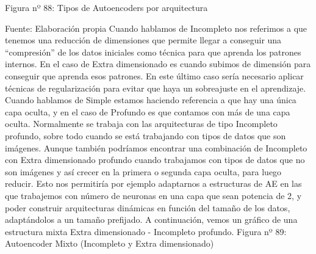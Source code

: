 \documentclass[
  a4paper,
  DIV=11,
  numbers=noendperiod]{scrreprt}
\begin{document}
Figura nº 88: Tipos de Autoencoders por arquitectura

Fuente: Elaboración propia Cuando hablamos de Incompleto nos referimos a
que tenemos una reducción de dimensiones que permite llegar a conseguir
una ``compresión'' de los datos iniciales como técnica para que aprenda
los patrones internos. En el caso de Extra dimensionado es cuando
subimos de dimensión para conseguir que aprenda esos patrones. En este
último caso sería necesario aplicar técnicas de regularización para
evitar que haya un sobreajuste en el aprendizaje. Cuando hablamos de
Simple estamos haciendo referencia a que hay una única capa oculta, y en
el caso de Profundo es que contamos con más de una capa oculta.
Normalmente se trabaja con las arquitecturas de tipo Incompleto
profundo, sobre todo cuando se está trabajando con tipos de datos que
son imágenes. Aunque también podríamos encontrar una combinación de
Incompleto con Extra dimensionado profundo cuando trabajamos con tipos
de datos que no son imágenes y así crecer en la primera o segunda capa
oculta, para luego reducir. Esto nos permitiría por ejemplo adaptarnos a
estructuras de AE en las que trabajemos con número de neuronas en una
capa que sean potencia de 2, y poder construir arquitecturas dinámicas
en función del tamaño de los datos, adaptándolos a un tamaño prefijado.
A continuación, vemos un gráfico de una estructura mixta Extra
dimensionado - Incompleto profundo. Figura nº 89: Autoencoder Mixto
(Incompleto y Extra dimensionado)
\end{document}
